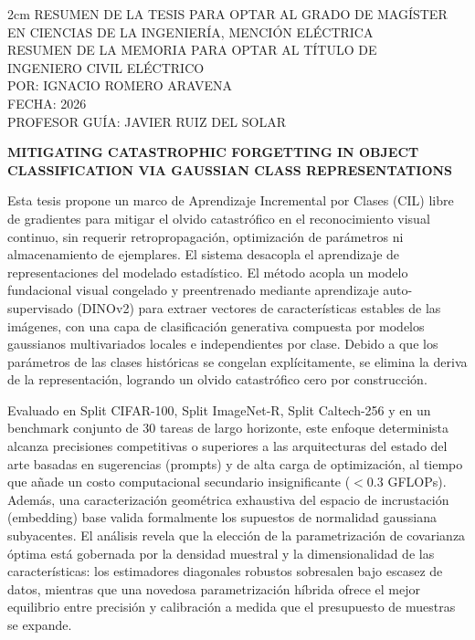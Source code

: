 
\begin{adjustwidth}{2cm}{}
	\MakeUppercase{Resumen de la tesis para optar al grado de magíster}\\
	\MakeUppercase{en ciencias de la ingeniería, mención eléctrica}\\
	\MakeUppercase{Resumen de la memoria para optar al título de}\\
	\MakeUppercase{ingeniero civil eléctrico}\\
	\MakeUppercase{Por: Ignacio Romero Aravena}\\
	\MakeUppercase{Fecha: 2026}\\
	\MakeUppercase{Profesor Guía: Javier Ruiz del Solar}\\
\end{adjustwidth}

\vspace{-1cm}

\begin{center}
	\textbf{\MakeUppercase{Mitigating Catastrophic Forgetting in Object Classification via Gaussian Class Representations
	}}
\end{center}
Esta tesis propone un marco de Aprendizaje Incremental por Clases (CIL) libre de gradientes para mitigar el olvido catastrófico en el reconocimiento visual continuo, sin requerir retropropagación, optimización de parámetros ni almacenamiento de ejemplares. El sistema desacopla el aprendizaje de representaciones del modelado estadístico. El método acopla un modelo fundacional visual congelado y preentrenado mediante aprendizaje auto-supervisado (DINOv2) para extraer vectores de características estables de las imágenes, con una capa de clasificación generativa compuesta por modelos gaussianos multivariados locales e independientes por clase. Debido a que los parámetros de las clases históricas se congelan explícitamente, se elimina la deriva de la representación, logrando un olvido catastrófico cero por construcción.

Evaluado en Split CIFAR-100, Split ImageNet-R, Split Caltech-256 y en un benchmark conjunto de 30 tareas de largo horizonte, este enfoque determinista alcanza precisiones competitivas o superiores a las arquitecturas del estado del arte basadas en sugerencias (prompts) y de alta carga de optimización, al tiempo que añade un costo computacional secundario insignificante ($<0.3$ GFLOPs). Además, una caracterización geométrica exhaustiva del espacio de incrustación (embedding) base valida formalmente los supuestos de normalidad gaussiana subyacentes. El análisis revela que la elección de la parametrización de covarianza óptima está gobernada por la densidad muestral y la dimensionalidad de las características: los estimadores diagonales robustos sobresalen bajo escasez de datos, mientras que una novedosa parametrización híbrida ofrece el mejor equilibrio entre precisión y calibración a medida que el presupuesto de muestras se expande. 
\newpage

